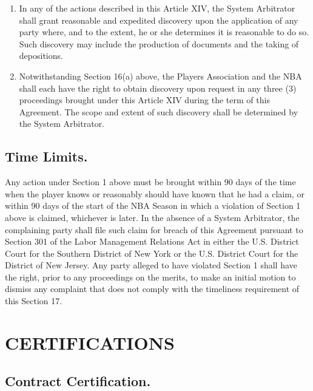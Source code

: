 \documentclass[
]{book}
\providecommand{\tightlist}{%
  \setlength{\itemsep}{0pt}\setlength{\parskip}{0pt}}
\begin{document}
\begin{enumerate}
\def\labelenumi{(\alph{enumi})}
\tightlist
\item
  In any of the actions described in this Article XIV, the System Arbitrator shall grant reasonable and expedited discovery upon the application of any party where, and to the extent, he or she determines it is reasonable to do so. Such discovery may include the production of documents and the taking of depositions.
\item
  Notwithstanding Section 16(a) above, the Players Association and the NBA shall each have the right to obtain discovery upon request in any three (3) proceedings brought under this Article XIV during the term of this Agreement. The scope and extent of such discovery shall be determined by the System Arbitrator.
\end{enumerate}

\hypertarget{time-limits.}{%
\section{Time Limits.}\label{time-limits.}}

Any action under Section 1 above must be brought within 90 days of the time when the player knows or reasonably should have known that he had a claim, or within 90 days of the start of the NBA Season in which a violation of Section 1 above is claimed, whichever is later. In the absence of a System Arbitrator, the complaining party shall file such claim for breach of this Agreement pursuant to Section 301 of the Labor Management Relations Act in either the U.S. District Court for the Southern District of New York or the U.S. District Court for the District of New Jersey. Any party alleged to have violated Section 1 shall have the right, prior to any proceedings on the merits, to make an initial motion to dismiss any complaint that does not comply with the timeliness requirement of this Section 17.

\hypertarget{certifications}{%
\chapter{CERTIFICATIONS}\label{certifications}}

\hypertarget{contract-certification.}{%
\section{Contract Certification.}\label{contract-certification.}}
\end{document}
